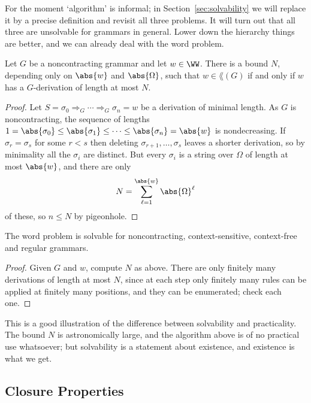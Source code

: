 For the moment `algorithm' is informal; in Section~\ref{sec:solvability} we will replace it by a precise definition and revisit all three problems. It will turn out that all three are unsolvable for grammars in general. Lower down the hierarchy things are better, and we can already deal with the word problem.

\begin{lemma}\label{lem:wordproblembound}
	Let $G$ be a noncontracting grammar and let $w \in \WW$. There is a bound $N$, depending only on $\abs{w}$ and $\abs{\Omega}$, such that $w \in \lang(G)$ if and only if $w$ has a $G$-derivation of length at most $N$.
\end{lemma}

\begin{proof}
	Let $S = \sigma_0 \Rightarrow_G \cdots \Rightarrow_G \sigma_n = w$ be a derivation of minimal length. As $G$ is noncontracting, the sequence of lengths $1 = \abs{\sigma_0} \leq \abs{\sigma_1} \leq \cdots \leq \abs{\sigma_n} = \abs{w}$ is nondecreasing. If $\sigma_r = \sigma_s$ for some $r < s$ then deleting $\sigma_{r+1}, \dots, \sigma_s$ leaves a shorter derivation, so by minimality all the $\sigma_i$ are distinct. But every $\sigma_i$ is a string over $\Omega$ of length at most $\abs{w}$, and there are only
	$$N = \sum_{\ell = 1}^{\abs{w}} \abs{\Omega}^\ell$$
	of these, so $n \leq N$ by pigeonhole.
\end{proof}

\begin{corollary}\label{cor:wordproblemsolvable}
	The word problem is solvable for noncontracting, context-sensitive, context-free and regular grammars.
\end{corollary}

\begin{proof}
	Given $G$ and $w$, compute $N$ as above. There are only finitely many derivations of length at most $N$, since at each step only finitely many rules can be applied at finitely many positions, and they can be enumerated; check each one.
\end{proof}

This is a good illustration of the difference between solvability and practicality. The bound $N$ is astronomically large, and the algorithm above is of no practical use whatsoever; but solvability is a statement about existence, and existence is what we get.

\subsection{Closure Properties}

